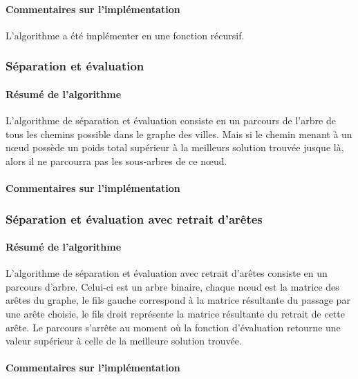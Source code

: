 \documentclass[10pt,a4paper]{report}
\begin{document}
		\paragraph{Commentaires sur l'implémentation}
		\begin{flushleft}
		L'algorithme a été implémenter en une fonction récursif.
		\end{flushleft}
		\subsubsection{Séparation et évaluation}
		
		\paragraph{Résumé de l'algorithme}
		L'algorithme de séparation et évaluation consiste en un parcours de l'arbre de tous les chemins possible dans le graphe des villes. Mais si le chemin menant à un nœud possède un poids total supérieur à la meilleurs solution trouvée jusque là, alors il ne parcourra pas les sous-arbres de ce nœud.\\
		
		\paragraph{Commentaires sur l'implémentation}
		
		
		
		\subsubsection{Séparation et évaluation avec retrait d'arêtes}		
		
		\paragraph{Résumé de l'algorithme}
		L'algorithme de séparation et évaluation avec retrait d'arêtes consiste en un parcours d'arbre. Celui-ci est un arbre binaire, chaque nœud est la matrice des arêtes du graphe, le fils gauche correspond à la matrice résultante du passage par une arête choisie, le fils droit représente la matrice résultante du retrait de cette arête. Le parcours s'arrête au moment où la fonction d'évaluation retourne une valeur supérieur à celle de la meilleure solution trouvée.\\
		
		\paragraph{Commentaires sur l'implémentation}		
		
\end{document}
